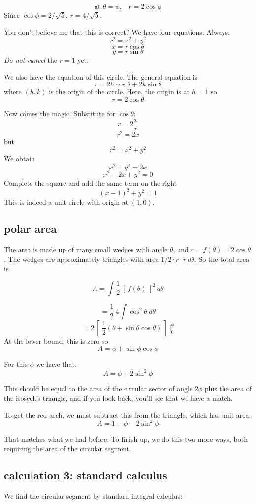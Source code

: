 \documentclass[11pt, oneside]{article}
\begin{document}
\[ \text{at } \theta = \phi, \ \ \ \ r = 2 \cos \phi  \]
Since $\cos \phi = 2 / \sqrt{5}$, $r = 4/\sqrt{5}$.

You don't believe me that this is correct?  We have four equations.  Always:
\[ r^2 = x^2 + y^2 \]
\[ x = r \cos \theta  \]
\[ y = r \sin \theta  \]
\emph{Do not cancel} the $r = 1$ yet.

We also have the equation of this circle.  The general equation is
\[ r = 2h \cos \theta + 2k \sin \theta \]
where $(h,k)$ is the origin of the circle.  Here, the origin is at $h = 1$ so
\[ r = 2 \cos \theta \]

Now comes the magic.  Substitute for $\cos \theta $:
\[ r = 2 \frac{x}{r} \]
\[ r^2 = 2 x \]
but
\[ r^2 = x^2 + y^2  \]
We obtain
\[ x^2 + y^2 = 2x \]
\[ x^2 - 2x + y^2 = 0 \]
Complete the square and add the same term on the right
\[ (x - 1)^2 + y^2 = 1 \]
This is indeed a unit circle with origin at $(1,0)$.

\subsection*{polar area}

The area is made up of many small wedges with angle $\theta$, and $r = f(\theta) = 2 \cos \theta $.  The wedges are approximately triangles with area $1/2 \cdot r \cdot r \ d \theta$.  So the total area is

\[ A = \int \frac{1}{2} \ [ \ f(\theta) \ ]^2 \ d \theta \]

\[ = \frac{1}{2} \ 4 \int \cos^2 \theta \ d \theta\]
\[ = 2 \ [ \ \frac{1}{2} (\theta + \sin \theta \cos \theta) \ ] \ \bigg |_0^{\phi} \]
At the lower bound, this is zero so
\[ A = \phi + \sin \phi \cos \phi \]

For this $\phi$ we have that:
\[ A = \phi + 2 \sin^2 \phi \]

This should be equal to the area of the circular sector of angle $2 \phi$ plus the area of the isosceles triangle, and if you look back, you'll see that we have a match.

To get the red arch, we must subtract this from the triangle, which has unit area.
\[ A = 1 - \phi - 2 \sin^2 \phi \]

That matches what we had before.  To finish up, we do this two more ways, both requiring the area of the circular segment.

\subsection*{calculation 3:  standard calculus}
We find the circular segment by standard integral calculus:
\end{document}
